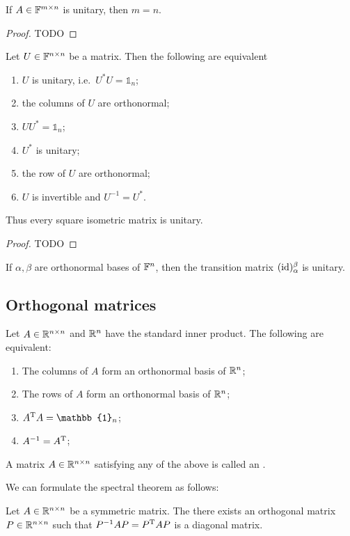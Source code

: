 \begin{lemma}
If $A\in \mathbb{F}^{m\times n}$ is unitary, then $m=n$.
\end{lemma}
\begin{proof}
TODO
\end{proof}

\begin{lemma}
Let $U\in\mathbb{F}^{n\times n}$ be a matrix. Then the following are equivalent
\begin{enumerate}
\item $U$ is unitary, i.e.\ $U^*U=\mathbb{1}_n$;
\item the columns of $U$ are orthonormal;
\item $UU^*=\mathbb{1}_n$;
\item $U^*$ is unitary;
\item the row of $U$ are orthonormal;
\item $U$ is invertible and $U^{-1} = U^*$.
\end{enumerate}
\end{lemma}
Thus every square isometric matrix is unitary.
\begin{proof}
TODO
\end{proof}

\begin{corollary}
If $\alpha,\beta$ are orthonormal bases of $\mathbb{F}^{n}$, then the transition matrix $(\operatorname{id})_\alpha^\beta$ is unitary.
\end{corollary}


\subsection{Orthogonal matrices}
\begin{proposition}
Let $A\in\mathbb{R}^{n\times n}$ and $\mathbb{R}^n$ have the standard inner product. The following are equivalent:
\begin{enumerate}
\item The columns of $A$ form an orthonormal basis of $\mathbb{R}^n$;
\item The rows of $A$ form an orthonormal basis of $\mathbb{R}^n$;
\item $A^\transp A = \mathbb{1}_n$;
\item $A^{-1} = A^{\mathrm{T}}$;
\end{enumerate}
\end{proposition}
\begin{definition}
A matrix $A\in\mathbb{R}^{n\times n}$ satisfying any of the above is called an .
\end{definition}
We can formulate the spectral theorem as follows:
\begin{proposition}
Let $A\in\mathbb{R}^{n\times n}$ be a symmetric matrix. The there exists an orthogonal matrix $P\in \mathbb{R}^{n\times n}$ such that $P^{-1}AP = P^{\mathrm{T}} A P$ is a diagonal matrix.
\end{proposition}

